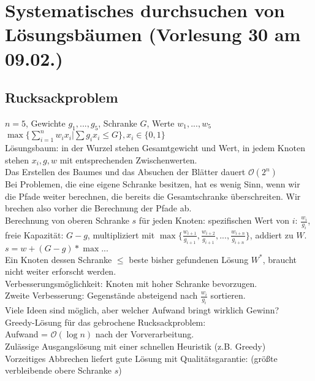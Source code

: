 \section{Systematisches durchsuchen von Lösungsbäumen \tiny (Vorlesung 30 am 09.02.)}
\subsection{Rucksackproblem}
$n=5$, Gewichte $g_1,...,g_5$, Schranke $G$, Werte $w_1,...,w_5$\\
$\max\{\sum_{i=1}^n w_ix_i|\sum g_ix_i \leq G \}, x_i \in \{0,1\}$\\
Lösungsbaum: in der Wurzel stehen Gesamtgewicht und Wert, in jedem Knoten stehen $x_i, g, w$ mit entsprechenden Zwischenwerten.\\
Das Erstellen des Baumes und das Absuchen der Blätter dauert $\mathcal{O}(2^n)$\\

Bei Problemen, die eine eigene Schranke besitzen, hat es wenig Sinn, wenn wir die Pfade weiter berechnen, die bereits die Gesamtschranke überschreiten. Wir brechen also vorher die Berechnung der Pfade ab.\\
Berechnung von oberen Schranke $s$ für jeden Knoten:
spezifischen Wert von $i$: $\frac{w_i}{g_i}$, freie Kapazität: $G-g$, multipliziert mit $\max\{ \frac{w_{i+1}}{g_{i+1}},\frac{w_{i+2}}{g_{i+1}},...,\frac{w_{i+n}}{g_{i+n}} \}$, addiert zu $W$.\\
$s=w+(G-g)*\max...$\\
Ein Knoten dessen Schranke $\leq$ beste bisher gefundenen Lösung $W^*$, braucht nicht weiter erforscht werden.\\
Verbesserungsmöglichkeit: Knoten mit hoher Schranke bevorzugen.\\
Zweite Verbesserung: Gegenstände absteigend nach $\frac{w_i}{g_i}$ sortieren.\\
Viele Ideen sind möglich, aber welcher Aufwand bringt wirklich Gewinn?\\
Greedy-Lösung für das gebrochene Rucksackproblem:\\
Aufwand = $\mathcal{O}(\log n)$ nach der Vorverarbeitung.\\
Zulässige Ausgangslösung mit einer schnellen Heuristik (z.B. Greedy)\\
Vorzeitiges Abbrechen liefert gute Lösung mit Qualitätsgarantie: (größte verbleibende obere Schranke $s$)\\

